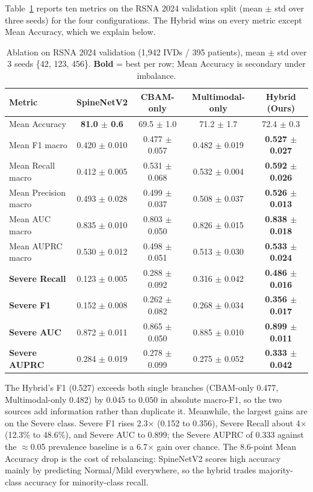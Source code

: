 \documentclass[runningheads]{llncs}
\newcommand{\best}[1]{\textbf{#1}}
\begin{document}
Table~\ref{tab:main} reports ten metrics on the RSNA 2024 validation split (mean $\pm$ std over three seeds) for the four configurations. The Hybrid wins on every metric except Mean Accuracy, which we explain below.

\begin{table}[htbp]
\centering
\caption{Ablation on RSNA 2024 validation (1{,}942 IVDs / 395 patients), mean $\pm$ std over 3 seeds \{42, 123, 456\}. \textbf{Bold} = best per row; Mean Accuracy is secondary under imbalance.}
\label{tab:main}
\footnotesize
\setlength{\tabcolsep}{2pt}
\begin{tabular}{@{}lcccc@{}}
\toprule
\textbf{Metric} & \textbf{SpineNetV2} & \textbf{CBAM-only} & \textbf{Multimodal-only} & \textbf{Hybrid (Ours)} \\
\midrule
Mean Accuracy        & \best{81.0 $\pm$ 0.6} & 69.5 $\pm$ 1.0 & 71.2 $\pm$ 1.7 & 72.4 $\pm$ 0.3 \\
Mean F1 macro        & 0.420 $\pm$ 0.010 & 0.477 $\pm$ 0.057 & 0.482 $\pm$ 0.019 & \best{0.527 $\pm$ 0.027} \\
Mean Recall macro    & 0.412 $\pm$ 0.005 & 0.531 $\pm$ 0.068 & 0.532 $\pm$ 0.004 & \best{0.592 $\pm$ 0.026} \\
Mean Precision macro & 0.493 $\pm$ 0.028 & 0.499 $\pm$ 0.037 & 0.508 $\pm$ 0.037 & \best{0.526 $\pm$ 0.013} \\
Mean AUC macro       & 0.835 $\pm$ 0.010 & 0.803 $\pm$ 0.050 & 0.826 $\pm$ 0.015 & \best{0.838 $\pm$ 0.018} \\
Mean AUPRC macro     & 0.530 $\pm$ 0.012 & 0.498 $\pm$ 0.051 & 0.513 $\pm$ 0.030 & \best{0.533 $\pm$ 0.024} \\
\midrule
\textbf{Severe Recall} & 0.123 $\pm$ 0.005 & 0.288 $\pm$ 0.092 & 0.316 $\pm$ 0.042 & \best{0.486 $\pm$ 0.016} \\
\textbf{Severe F1}    & 0.152 $\pm$ 0.008 & 0.262 $\pm$ 0.082 & 0.268 $\pm$ 0.034 & \best{0.356 $\pm$ 0.017} \\
\textbf{Severe AUC}   & 0.872 $\pm$ 0.011 & 0.865 $\pm$ 0.050 & 0.885 $\pm$ 0.010 & \best{0.899 $\pm$ 0.011} \\
\textbf{Severe AUPRC} & 0.284 $\pm$ 0.019 & 0.278 $\pm$ 0.099 & 0.275 $\pm$ 0.052 & \best{0.333 $\pm$ 0.042} \\
\bottomrule
\end{tabular}
\end{table}

The Hybrid's F1 (0.527) exceeds both single branches (CBAM-only 0.477, Multimodal-only 0.482) by $0.045$ to $0.050$ in absolute macro-F1, so the two sources add information rather than duplicate it. Meanwhile, the largest gains are on the Severe class. Severe F1 rises 2.3$\times$ (0.152 to 0.356), Severe Recall about 4$\times$ (12.3\% to 48.6\%), and Severe AUC to 0.899; the Severe AUPRC of 0.333 against the $\approx$0.05 prevalence baseline is a 6.7$\times$ gain over chance. The 8.6-point Mean Accuracy drop is the cost of rebalancing: SpineNetV2 scores high accuracy mainly by predicting Normal/Mild everywhere, so the hybrid trades majority-class accuracy for minority-class recall.
\end{document}

